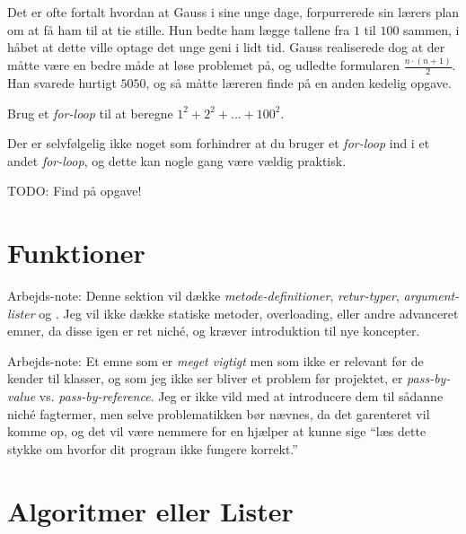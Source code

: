 	\begin{exercise}
		Det er ofte fortalt hvordan at Gauss i sine unge dage, forpurrerede sin
		lærers plan om at få ham til at tie stille. Hun bedte ham lægge tallene
		fra \(1\) til \(100\) sammen, i håbet at dette ville optage det unge
		geni i lidt tid. Gauss realiserede dog at der måtte være en bedre måde
		at løse problemet på, og udledte formularen \(\frac{n\cdot(n+1)}{2}\).
		Han svarede hurtigt \(5050\), og så måtte læreren finde på en anden
		kedelig opgave.

		Brug et \emph{for-loop} til at beregne \(1^2+2^2+\dots+100^2\).
	\end{exercise}

	\begin{exercise}
		Der er selvfølgelig ikke noget som forhindrer at du bruger et
		\emph{for-loop} ind i et andet \emph{for-loop}, og dette kan nogle gang
		være vældig praktisk.

		TODO: Find på opgave!
	\end{exercise}


\blindtext

\section{Funktioner}

	\begin{remark}  Arbejds-note:
		Denne sektion vil dække \emph{metode-definitioner}, \emph{retur-typer},
		\emph{argument-lister} og .
		Jeg vil ikke dække statiske metoder, overloading, eller andre advanceret
		emner, da disse igen er ret niché, og kræver introduktion til nye
		koncepter.
	\end{remark}

	\begin{remark}  Arbejds-note:
		Et emne som er \emph{meget vigtigt} men som ikke er relevant før de
		kender til klasser, og som jeg ikke ser bliver et problem før projektet,
		er \emph{pass-by-value} vs. \emph{pass-by-reference}.
		Jeg er ikke vild med at introducere dem til sådanne niché fagtermer, men
		selve problematikken bør nævnes, da det garenteret vil komme op, og det
		vil være nemmere for en hjælper at kunne sige ``læs dette stykke om
		hvorfor dit program ikke fungere korrekt.''
	\end{remark}

\blindtext

\section{Algoritmer eller Lister}

